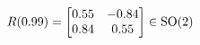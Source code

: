 \documentclass[preview]{standalone}
\begin{document}
\begin{align*}
\special{dvisvgm:raw <g id='unique000'>}R(0.99) = \begin{bmatrix} 0.55 & -0.84 \\ 0.84 & 0.55 \end{bmatrix} \in \text{SO}(2)\special{dvisvgm:raw </g>}
\end{align*}
\end{document}
